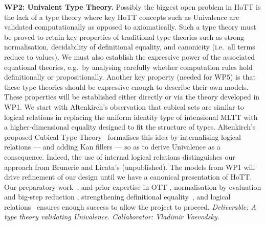 \documentclass[a4paper,11pt]{article}
\begin{document}
{\bf WP2: Univalent Type Theory.}  Possibly the biggest open problem
in HoTT is the lack of a type theory where key HoTT concepts such as
Univalence are validated computationally as opposed to
axiomatically. Such a type theory must be proved to retain key
properties of traditional type theories such as strong normalisation,
decidability of definitional equality, and canonicity ({i.e.}~all
terms reduce to values). We must also establish the expressive power
of the associated equational theories, {e.g.}~by analysing carefully
whether computation rules hold definitionally or
propositionally. Another key property (needed for WP5) is that these
type theories should be expressive enough to describe their own
models. These properties will be established either directly or via
the theory developed in WP1. We start with Altenkirch's observation
\cite{txa-ihp14} that cubical sets are similar to 
logical relations in replacing the uniform identity type of
intensional MLTT with a higher-dimensional equality designed to fit
the structure of types. Altenkirch's proposed Cubical Type
Theory~\cite{alti-ctt} formalises this idea by internalising logical
relations --- and adding Kan fillers --- so as to derive Univalence as
a consequence. Indeed, the use of internal logical relations
distinguishes our approach from Brunerie and Licata's (unpublished).
The models from WP1 will drive refinement of our design until we have
a canonical presentation of HoTT. Our preparatory
work~\cite{txa-ihp14,alti-ctt}, and prior expertise in OTT
\cite{alti:ott-conf}, normalisation by evaluation and big-step
reduction \cite{alti:lics96}, strengthening definitional
equality~\cite{Allais:2013:NEN:2502409.2502411}, and logical
relations~\cite{neil2014relParamDep} ensures enough success to allow
the project to proceed.  {\em Deliverable: A type theory validating
  Univalence.  Collaborator: Vladimir Voevodsky.  }
\end{document}
